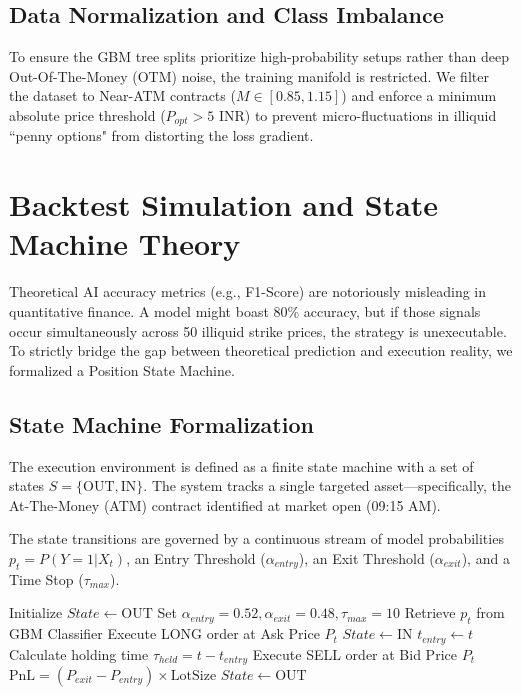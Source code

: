 \documentclass[11pt, a4paper]{article}
\begin{document}
\subsection{Data Normalization and Class Imbalance}
To ensure the GBM tree splits prioritize high-probability setups rather than deep Out-Of-The-Money (OTM) noise, the training manifold is restricted. We filter the dataset to Near-ATM contracts ($M \in [0.85, 1.15]$) and enforce a minimum absolute price threshold ($P_{opt} > 5$ INR) to prevent micro-fluctuations in illiquid ``penny options" from distorting the loss gradient.

\section{Backtest Simulation and State Machine Theory}
Theoretical AI accuracy metrics (e.g., F1-Score) are notoriously misleading in quantitative finance. A model might boast 80\% accuracy, but if those signals occur simultaneously across 50 illiquid strike prices, the strategy is unexecutable. To strictly bridge the gap between theoretical prediction and execution reality, we formalized a Position State Machine.

\subsection{State Machine Formalization}
The execution environment is defined as a finite state machine with a set of states $S = \{\text{OUT}, \text{IN}\}$. The system tracks a single targeted asset—specifically, the At-The-Money (ATM) contract identified at market open (09:15 AM). 

The state transitions are governed by a continuous stream of model probabilities $p_t = P(Y=1 | X_t)$, an Entry Threshold ($\alpha_{entry}$), an Exit Threshold ($\alpha_{exit}$), and a Time Stop ($\tau_{max}$).

\begin{algorithm}[H]
\caption{Position State Machine Execution Logic}
\begin{algorithmic}[1]
\State Initialize $State \gets \text{OUT}$
\State Set $\alpha_{entry} = 0.52, \alpha_{exit} = 0.48, \tau_{max} = 10$
    \State Retrieve $p_t$ from GBM Classifier
            \State Execute LONG order at Ask Price $P_t$
            \State $State \gets \text{IN}$
            \State $t_{entry} \gets t$
        \EndIf
        \State Calculate holding time $\tau_{held} = t - t_{entry}$
            \State Execute SELL order at Bid Price $P_t$
            \State $\text{PnL} = (P_{exit} - P_{entry}) \times \text{LotSize}$
            \State $State \gets \text{OUT}$
        \EndIf
    \EndIf
\EndFor
\end{algorithmic}
\end{algorithm}
\end{document}
